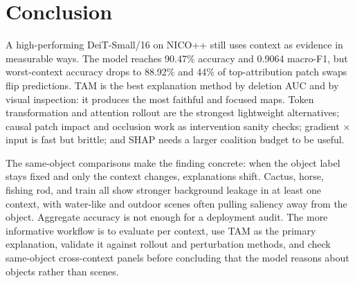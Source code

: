\documentclass[10pt]{article}
\begin{document}
\section{Conclusion}
A high-performing DeiT-Small/16 on NICO++ still uses context as evidence in measurable ways. The model reaches 90.47\% accuracy and 0.9064 macro-F1, but worst-context accuracy drops to 88.92\% and 44\% of top-attribution patch swaps flip predictions. TAM is the best explanation method by deletion AUC and by visual inspection: it produces the most faithful and focused maps. Token transformation and attention rollout are the strongest lightweight alternatives; causal patch impact and occlusion work as intervention sanity checks; gradient $\times$ input is fast but brittle; and SHAP needs a larger coalition budget to be useful.

The same-object comparisons make the finding concrete: when the object label stays fixed and only the context changes, explanations shift. Cactus, horse, fishing rod, and train all show stronger background leakage in at least one context, with water-like and outdoor scenes often pulling saliency away from the object. Aggregate accuracy is not enough for a deployment audit. The more informative workflow is to evaluate per context, use TAM as the primary explanation, validate it against rollout and perturbation methods, and check same-object cross-context panels before concluding that the model reasons about objects rather than scenes.
\end{document}
